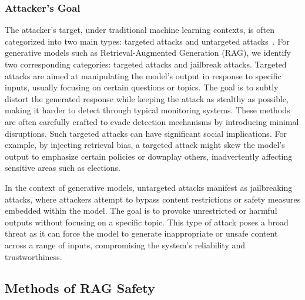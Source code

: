 \subsubsection{Attacker's Goal} The attacker's target, under traditional machine
learning contexts, is often categorized into two main types: targeted attacks
and untargeted attacks~\cite{trustworthy_graph_neural_networks_2024,
trustworthy_llms_2024}. For generative models such as Retrieval-Augmented
Generation (RAG), we identify two corresponding categories: targeted attacks and
jailbreak attacks. 
Targeted attacks are aimed at
manipulating the model's output in response to specific inputs, usually focusing
on certain questions or topics. The goal is to subtly distort the generated
response while keeping the attack as stealthy as possible, making it harder to
detect through typical monitoring systems. These methods are often carefully
crafted to evade detection mechanisms by introducing minimal disruptions. Such
targeted attacks can have significant social implications. For example, by
injecting retrieval bias, a targeted attack might skew the model's output to
emphasize certain policies or downplay others, inadvertently affecting sensitive
areas such as elections. 

In the context of generative models, untargeted attacks manifest as jailbreaking attacks, where attackers attempt to bypass content restrictions or safety measures embedded within the model. The goal is to provoke unrestricted or harmful outputs without focusing on a specific topic. This type of attack poses a broad threat as it can force the model to generate inappropriate or unsafe content across a range of inputs, compromising the system’s reliability and trustworthiness.

\subsection{Methods of RAG Safety}
